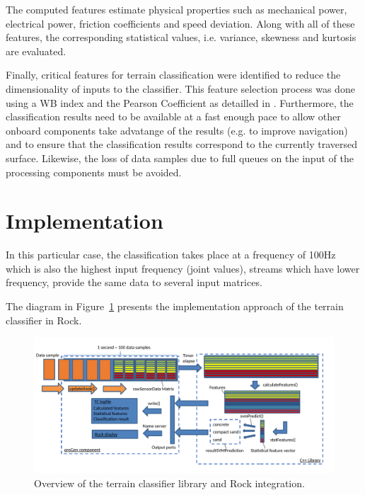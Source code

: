 \documentclass{article}
\begin{document}
The computed features estimate physical properties such as mechanical power, electrical power, friction coefficients and speed deviation. Along with all of these features, the corresponding statistical values, i.e. variance, skewness and kurtosis are evaluated. 

Finally, critical features for terrain classification were identified to reduce the dimensionality of inputs to the classifier.
This feature selection process was done using a WB index and the Pearson Coefficient as detailled in \cite{Dimastrogiovanni2020}. 
Furthermore, the classification results need to be available at a fast enough pace to allow other onboard components take advatange of the results (e.g. to improve navigation) and to ensure that the classification results correspond to the currently traversed surface. 
Likewise, the loss of data samples due to full queues on the input of the processing components must be avoided. 

\section{Implementation}

In this particular case, the classification takes place at a frequency of 100Hz which is also the highest input frequency (joint values), streams which have lower frequency, provide the same data to several input matrices.



The diagram in Figure~\ref{fig:overview} presents the implementation approach of the terrain classifier in Rock.

\begin{figure}[h]
\centering
\includegraphics[width=\textwidth]{../figures/OverviewTC2.pdf}
\caption{\label{fig:overview}Overview of the terrain classifier library and Rock integration.}
\end{figure}
\end{document}
